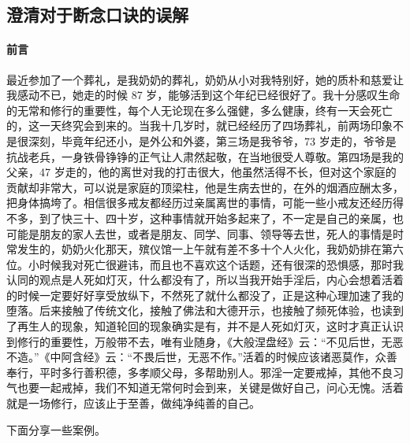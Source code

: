 \subsection{澄清对于断念口诀的误解}

\paragraph{前言}

最近参加了一个葬礼，是我奶奶的葬礼，奶奶从小对我特别好，她的质朴和慈爱让我感动不已，她走的时候 87 岁，能够活到这个年纪已经很好了。我十分感叹生命的无常和修行的重要性，每个人无论现在多么强健，多么健康，终有一天会死亡的，这一天终究会到来的。当我十几岁时，就已经经历了四场葬礼，前两场印象不是很深刻，毕竟年纪还小，是外公和外婆，第三场是我爷爷，73 岁走的，爷爷是抗战老兵，一身铁骨铮铮的正气让人肃然起敬，在当地很受人尊敬。第四场是我的父亲，47 岁走的，他的离世对我的打击很大，他虽然活得不长，但对这个家庭的贡献却非常大，可以说是家庭的顶梁柱，他是生病去世的，在外的烟酒应酬太多，把身体搞垮了。相信很多戒友都经历过亲属离世的事情，可能一些小戒友还经历得不多，到了快三十、四十岁，这种事情就开始多起来了，不一定是自己的亲属，也可能是朋友的家人去世，或者是朋友、同学、同事、领导等去世，死人的事情是时常发生的，奶奶火化那天，殡仪馆一上午就有差不多十个人火化，我奶奶排在第六位。小时候我对死亡很避讳，而且也不喜欢这个话题，还有很深的恐惧感，那时我认同的观点是人死如灯灭，什么都没有了，所以当我开始手淫后，内心会想着活着的时候一定要好好享受放纵下，不然死了就什么都没了，正是这种心理加速了我的堕落。后来接触了传统文化，接触了佛法和大德开示，也接触了频死体验，也读到了再生人的现象，知道轮回的现象确实是有，并不是人死如灯灭，这时才真正认识到修行的重要性，万般带不去，唯有业随身，《大般涅盘经》云：“不见后世，无恶不造。”《中阿含经》云：“不畏后世，无恶不作。”活着的时候应该诸恶莫作，众善奉行，平时多行善积德，多孝顺父母，多帮助别人。邪淫一定要戒掉，其他不良习气也要一起戒掉，我们不知道无常何时会到来，关键是做好自己，问心无愧。活着就是一场修行，应该止于至善，做纯净纯善的自己。

下面分享一些案例。

